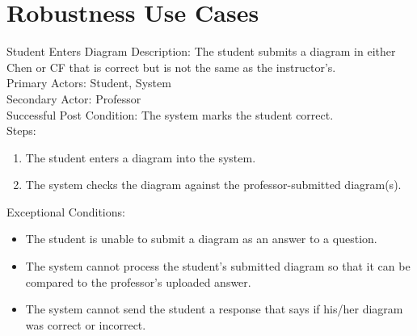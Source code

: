 \chapter{Robustness Use Cases}
    \begin{section}{Student Enters Diagram}
        Description: The student submits a diagram in either Chen or CF that is correct but is not the same as the instructor’s.\\
        Primary Actors: Student, System\\
        Secondary Actor: Professor\\
        Successful Post Condition: The system marks the student correct.\\
        Steps:
        \begin{enumerate}
            \item The student enters a diagram into the system.
            \item The system checks the diagram against the professor-submitted diagram(s).
        \end{enumerate}
        Exceptional Conditions:
        \begin{itemize}
            \item The student is unable to submit a diagram as an answer to a question.
            \item The system cannot process the student’s submitted diagram so that it can be compared to the professor’s uploaded answer.
            \item The system cannot send the student a response that says if his/her diagram was correct or incorrect.
        \end{itemize}
    \end{section}
    
